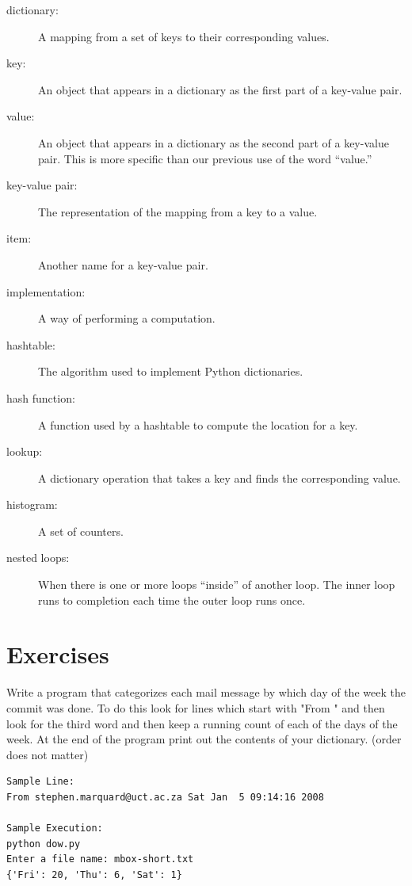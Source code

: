 \documentclass[10pt]{book}
\begin{document}
\begin{description}

\item[dictionary:] A mapping from a set of keys to their
corresponding values.

\item[key:] An object that appears in a dictionary as the
first part of a key-value pair.

\item[value:] An object that appears in a dictionary as the
second part of a key-value pair.  This is more specific than
our previous use of the word ``value.''

\item[key-value pair:] The representation of the mapping from
a key to a value.

\item[item:] Another name for a key-value pair.

\item[implementation:] A way of performing a computation.

\item[hashtable:] The algorithm used to implement Python
dictionaries.

\item[hash function:] A function used by a hashtable to compute the
location for a key.

\item[lookup:] A dictionary operation that takes a key and finds
the corresponding value.

\item[histogram:] A set of counters.

\item[nested loops:] When there is one or more loops ``inside'' of 
another loop.  The inner loop runs to completion each time the outer
loop runs once.

\end{description}

\section{Exercises}

\begin{ex}
Write a program that categorizes each mail message by which 
day of the week the commit was done. To do this look for 
lines which start with "From " and then look for the 
third word and then keep a running count of each of the 
days of the week. At the end of the program print out the 
contents of your dictionary. (order does not matter)

\beforeverb
\begin{verbatim}
Sample Line:
From stephen.marquard@uct.ac.za Sat Jan  5 09:14:16 2008

Sample Execution:
python dow.py
Enter a file name: mbox-short.txt
{'Fri': 20, 'Thu': 6, 'Sat': 1}
\end{verbatim}
\afterverb
\end{ex}
\end{document}
